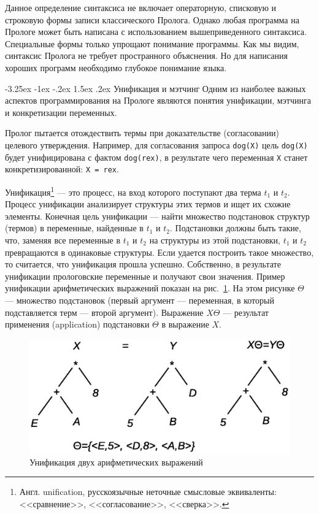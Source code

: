 \documentclass[12pt, openany, twoside]{book} %
\makeatletter
\renewcommand\section{\@startsection {section}{1}{\z@}%
                                   {-3.25ex \@plus -1ex \@minus -.2ex}%
                                   {1.5ex \@plus.2ex}%
                                   {\normalfont\large\bfseries}}
\makeatother
\begin{document}
Данное определение синтаксиса не включает операторную, списковую и строковую формы записи классического Пролога. Однако любая программа на Прологе может быть написана с использованием вышеприведенного синтаксиса. Специальные формы  только упрощают понимание программы. Как мы видим, синтаксис Пролога не требует пространного объяснения. Но для написания хороших программ необходимо глубокое понимание языка.

\section{Унификация и мэтчинг} Одним из наиболее важных аспектов программирования на Прологе являются понятия унификации, мэтчинга и конкретизации переменных.

Пролог пытается отождествить термы при доказательстве (согласовании) целевого утверждения. Например, для согласования запроса {\tt  dog(X)} цель {\tt  dog(X)} будет унифицирована с фактом {\tt dog(rex)}, в результате чего переменная {\tt Х} станет конкретизированной: {\tt Х = rex}.

Унификация\footnote{Англ. unification, русскоязычные неточные смысловые эквиваленты: <<сравнение>>, <<согласование>>, <<сверка>>.} --- это процесс, на вход которого поступают два терма $t_1$ и $t_2$. Процесс унификации анализирует структуры этих термов и ищет их схожие элементы. Конечная цель унификации --- найти множество подстановок структур (термов) в переменные, найденные в $t_1$ и $t_2$. Подстановки должны быть такие, что, заменяя все переменные в $t_1$ и $t_2$ на структуры из этой подстановки, $t_1$ и $t_2$ превращаются в одинаковые структуры. Если удается построить такое множество, то считается, что унификация прошла успешно. Собственно, в результате унификации прологовские переменные и получают свои значения. Пример унификации арифметических выражений показан на рис.~\ref{pic:unification}. На этом рисунке $\Theta$ --- множество подстановок (первый аргумент --- переменная, в который подставляется терм --- второй аргумент). Выражение $X\Theta$ --- результат применения (application) подстановки $\Theta$ в выражение $X$.
\begin{figure}[hbt]
\begin{center}
\includegraphics[scale=0.5]{pics/unification.eps}
\end{center}
\caption{Унификация двух арифметических выражений}
\label{pic:unification}
\end{figure}
\end{document}

